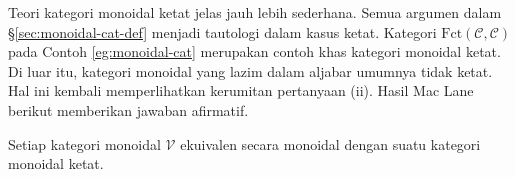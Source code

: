 Teori kategori monoidal ketat jelas jauh lebih sederhana. Semua argumen dalam \S\ref{sec:monoidal-cat-def} menjadi tautologi dalam kasus ketat. Kategori $\text{Fct}(\mathcal{C}, \mathcal{C})$ pada Contoh \ref{eg:monoidal-cat} merupakan contoh khas kategori monoidal ketat. Di luar itu, kategori monoidal yang lazim dalam aljabar umumnya tidak ketat. Hal ini kembali memperlihatkan kerumitan pertanyaan (ii). Hasil Mac Lane berikut \cite[VII.2]{ML98} memberikan jawaban afirmatif.

\begin{theorem}\label{prop:ML-coherence}
	Setiap kategori monoidal $\mathcal{V}$ ekuivalen secara monoidal dengan suatu kategori monoidal ketat.
\end{theorem}

